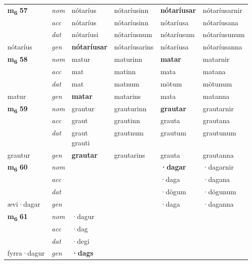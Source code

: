 \begin{longtable}[l]{X>{\footnotesize\itshape}XXXXX}
\multirow{3}{*}{{{\textbf{m{\textsubscript{6}}} \Large{\textbf{57}}}}} & nom & nótaríus & nótaríusinn & \textbf{nótaríusar} & nótaríusarnir \\*
 & acc & nótaríus & nótaríusinn & nótaríusa & nótaríusana \\*
 & dat & nótaríusi & nótaríusnum & nótaríusum & nótaríusunum \\*
 {\footnotesize{nótaríus}} & gen & \textbf{nótaríusar} & nótaríusarins & nótaríusa & nótaríusanna \\
\cmidrule{1-6}

\multirow{3}{*}{{{\textbf{m{\textsubscript{6}}} \Large{\textbf{58}}}}} & nom & matur & maturinn & \textbf{matar} & matarnir \\*
 & acc & mat & matinn & mata & matana \\*
 & dat & mat & matnum & mötum & mötunum \\*
 {\footnotesize{matur}} & gen & \textbf{matar} & matarins & mata & matanna \\
\cmidrule{1-6}

\multirow{3}{*}{{{\textbf{m{\textsubscript{6}}} \Large{\textbf{59}}}}} & nom & grautur & grauturinn & \textbf{grautar} & grautarnir \\*
 & acc & graut & grautinn & grauta & grautana \\*
 & dat & \specialcell{graut\\ grauti} & grautnum & grautum & grautunum \\*
 {\footnotesize{grautur}} & gen & \textbf{grautar} & grautarins & grauta & grautanna \\
\cmidrule{1-6}

\multirow{3}{*}{{{\textbf{m{\textsubscript{6}}} \Large{\textbf{60}}}}} & nom &  &  & \textbf{·dagar} & ·dagarnir \\*
 & acc &  &  & ·daga & ·dagana \\*
 & dat &  &  & ·dögum & ·dögunum \\*
 {\footnotesize{ævi\allowbreak ·dagar}} & gen & \textbf{} &  & ·daga & ·daganna \\
\cmidrule{1-6}

\multirow{3}{*}{{{\textbf{m{\textsubscript{6}}} \Large{\textbf{61}}}}} & nom & ·dagur &  & \textbf{} &  \\*
 & acc & ·dag &  &  &  \\*
 & dat & ·degi &  &  &  \\*
 {\footnotesize{fyrra\allowbreak ·dagur}} & gen & \textbf{·dags} &  &  &  \\
\cmidrule{1-6}


\end{longtable}
